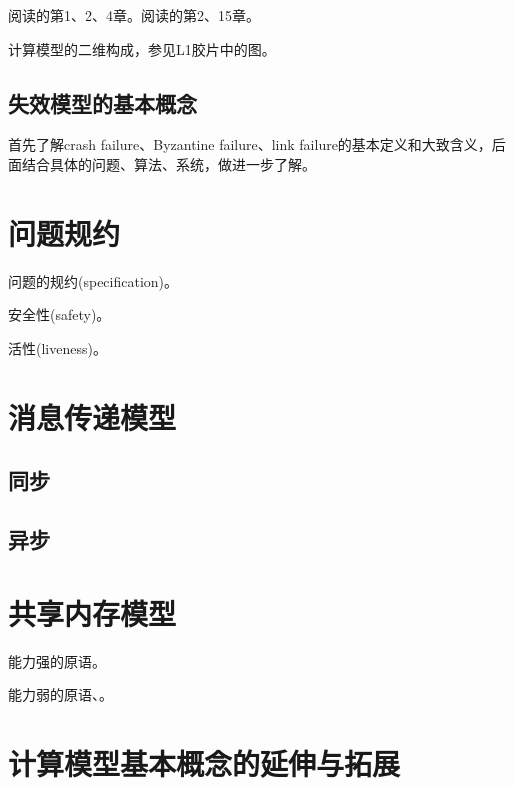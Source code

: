 \myleaf 阅读\cite{Attiya04}的第1、2、4章。阅读\cite{Aspnes19}的第2、15章。

\myleaf 计算模型的二维构成，参见L1胶片中的图。


\subsection{失效模型的基本概念}

首先了解crash failure、Byzantine failure、link failure的基本定义和大致含义，后面结合具体的问题、算法、系统，做进一步了解。


\section{问题规约}

问题的规约(specification)。

安全性(safety)。

活性(liveness)。




\section{消息传递模型}

\subsection{同步}

\subsection{异步}


\section{共享内存模型}

能力强的原语。

能力弱的原语、。	


\section{计算模型基本概念的延伸与拓展}

